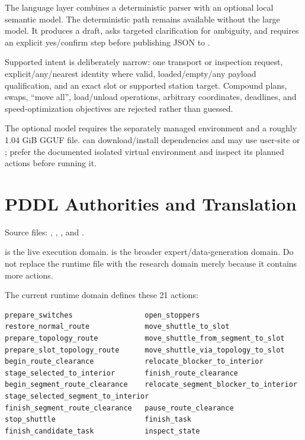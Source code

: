 The language layer combines a deterministic parser with an optional local
semantic model. The deterministic path remains available without the large
model. It produces a draft, asks targeted clarification for ambiguity, and
requires an explicit yes/confirm step before publishing JSON to
.

Supported intent is deliberately narrow: one transport or inspection request,
explicit/any/nearest identity where valid, loaded/empty/any payload
qualification, and an exact slot or supported station target. Compound plans,
swaps, ``move all'', load/unload operations, arbitrary coordinates, deadlines,
and speed-optimization objectives are rejected rather than guessed.

The optional model requires the separately managed
 environment and a roughly 1.04 GiB GGUF file.
 can
download/install dependencies and may
use user-site or ; prefer the documented isolated
virtual environment and inspect its planned actions before running it.

\section{PDDL Authorities and Translation}

Source files: ,
,
, and
.

 is the live execution domain.
 is the broader expert/data-generation domain. Do not
replace the runtime file with the research domain merely because it contains
more actions.

The current runtime domain defines these 21 actions:

\begin{lstlisting}
prepare_switches                 open_stoppers
restore_normal_route             move_shuttle_to_slot
prepare_topology_route           move_shuttle_from_segment_to_slot
prepare_slot_topology_route      move_shuttle_via_topology_to_slot
begin_route_clearance            relocate_blocker_to_interior
stage_selected_to_interior       finish_route_clearance
begin_segment_route_clearance    relocate_segment_blocker_to_interior
stage_selected_segment_to_interior
finish_segment_route_clearance   pause_route_clearance
stop_shuttle                     finish_task
finish_candidate_task            inspect_state
\end{lstlisting}

